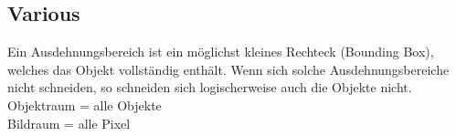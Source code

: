 \subsection{Various}
Ein Ausdehnungsbereich ist ein möglichst kleines Rechteck (Bounding Box), welches das Objekt vollständig enthält. Wenn sich solche Ausdehnungsbereiche nicht schneiden, so schneiden sich logischerweise auch die Objekte nicht.\\
Objektraum = alle Objekte\\
Bildraum = alle Pixel